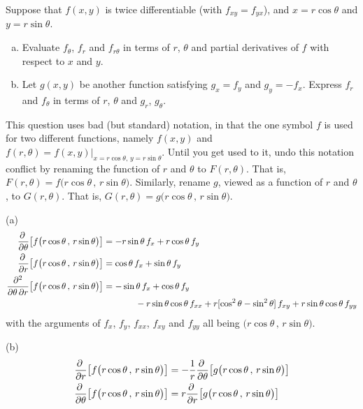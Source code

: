 \begin{question}[M200 2016D] %
Suppose that $f(x,y)$ is twice differentiable (with $f_{xy}=f_{yx}$),
and $x=r\cos\theta$ and $y=r\sin\theta$.
\begin{enumerate}[(a)]
\item
Evaluate $f_\theta$, $f_r$ and $f_{r\theta}$ in terms of $r$, $\theta$
and partial derivatives of $f$ with respect to $x$ and $y$.

\item
Let $g(x,y)$ be another function satisfying $g_x=f_y$ and $g_y=-f_x$.
Express $f_r$ and $f_\theta$ in terms of $r$, $\theta$ and $g_r$, $g_\theta$.
\end{enumerate}
\end{question}

\begin{hint}
This question uses bad (but standard) notation, in that the one symbol $f$
is used for two different functions, namely $f(x,y)$ and
$f(r,\theta)=f(x,y)\big|_{x=r\cos\theta,\,y=r\sin\theta}$.
Until you get used to it, undo this notation conflict by renaming the 
function of $r$ and $\theta$ to $F(r,\theta)$. That is,
$
F(r,\theta) = f\big(r\cos\theta\,,\,r\sin\theta\big)
$.
Similarly, rename $g$, viewed as a 
function of $r$ and $\theta$, to $G(r,\theta)$. That is,
$
G(r,\theta) = g\big(r\cos\theta\,,\,r\sin\theta\big)
$.

\end{hint}

\begin{answer}
(a)
\begin{align*}
\pdiff{}{\theta}\big[f\big(r\cos\theta\,,\,r\sin\theta\big)\big]
&=-r\sin\theta\, f_x
  +r\cos\theta\, f_y \\
\pdiff{}{r}\big[f\big(r\cos\theta\,,\,r\sin\theta\big)\big]
&= \cos\theta\, f_x
  +\sin\theta\, f_y \\
\frac{\partial^2}{\partial \theta\,\partial r}
         \big[f\big(r\cos\theta\,,\,r\sin\theta\big)\big] 
&=-\sin\theta\, f_x
  +\cos\theta\, f_y \\&\hskip0.5in
  -r\sin\theta\cos\theta\, f_{xx}
  +r[\cos^2\theta-\sin^2\theta]\, f_{xy}
  +r\sin\theta\cos\theta\, f_{yy}
\end{align*}
with the arguments of $f_x$, $f_y$, $f_{xx}$, $f_{xy}$ and $f_{yy}$
all being $\big(r\cos\theta\,,\,r\sin\theta\big)$.

(b)
\begin{align*}
\pdiff{}{r}\big[f\big(r\cos\theta\,,\,r\sin\theta\big)\big]
&=-\frac{1}{r} \pdiff{}{\theta}\big[g\big(r\cos\theta\,,\,r\sin\theta\big)\big]
\\
\pdiff{}{\theta}\big[f\big(r\cos\theta\,,\,r\sin\theta\big)\big]
&=r\pdiff{}{r}\big[g\big(r\cos\theta\,,\,r\sin\theta\big)\big]
\end{align*}
\end{answer}

